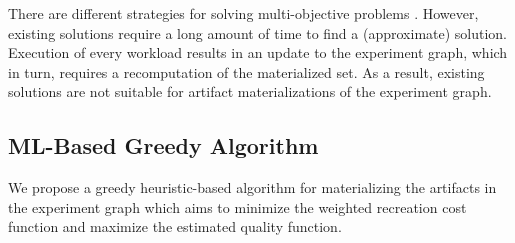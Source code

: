 There are different strategies for solving multi-objective problems \cite{coello2007evolutionary}.
However, existing solutions require a long amount of time to find a (approximate) solution.
Execution of every workload results in an update to the experiment graph, which in turn, requires a recomputation of the materialized set.
As a result, existing solutions are not suitable for artifact materializations of the experiment graph.

\subsection{ML-Based Greedy Algorithm}\label{subsec-ml-based-materialization}
We propose a greedy heuristic-based algorithm for materializing the artifacts in the experiment graph which aims to minimize the weighted recreation cost function and maximize the estimated quality function.

